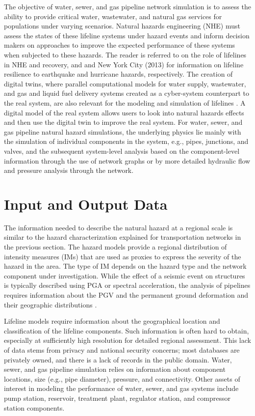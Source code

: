 The objective of water, sewer, and gas pipeline network simulation is to assess the ability to provide critical water, wastewater, and natural gas services for populations under varying scenarios. Natural hazards engineering (NHE) must assess the states of these lifeline systems under hazard events and inform decision makers on approaches to improve the expected performance of these systems when subjected to these hazards. The reader is referred to  \citet{johnson2016critical} on the role of lifelines in NHE and recovery, and \citet{orourke2014earthquakeresilient} and New York City (2013) for information on lifeline resilience to earthquake and hurricane hazards, respectively. 
The creation of digital twins, where parallel computational models for water supply, wastewater, and gas and liquid fuel delivery systems created as a cyber-system counterpart to the real system, are also relevant for the modeling and simulation of lifelines \citep{orourke2010geohazards, fan2019disaster}. A digital model of the real system allows users to look into natural hazards effects and then use the digital twin to improve the real system. For water, sewer, and gas pipeline natural hazard simulations, the underlying physics lie mainly with the simulation of individual components in the system, e.g., pipes, junctions, and valves, and the subsequent system-level analysis based on the component-level information through the use of network graphs or by more detailed hydraulic flow and pressure analysis through the network.
 
\section{Input and Output Data}
\label{sec:perf_pipeline_io}

The information needed to describe the natural hazard at a regional scale is similar to the hazard characterization explained for transportation networks in the previous section. The hazard models provide a regional distribution of intensity measures (IMs) that are used as proxies to express the severity of the hazard in the area. The type of IM depends on the hazard type and the network component under investigation. While the effect of a seismic event on structures is typically described using PGA or spectral acceleration, the analysis of pipelines requires information about the PGV and the permanent ground deformation and their geographic distributions \citep{romero2010seismic}.

Lifeline models require information about the geographical location and classification of the lifeline components. Such information is often hard to obtain, especially at sufficiently high resolution for detailed regional assessment. This lack of data stems from privacy and national security concerns; most databases are privately owned, and there is a lack of records in the public domain. Water, sewer, and gas pipeline simulation relies on information about component locations, size (e.g., pipe diameter), pressure, and connectivity. Other assets of interest in modeling the performance of water, sewer, and gas systems include pump station, reservoir, treatment plant, regulator station, and compressor station components.

